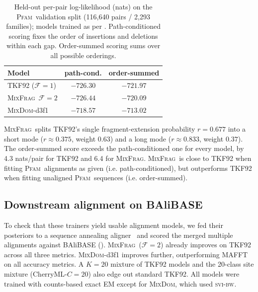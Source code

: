 \documentclass{article}
\newcommand{\MixFrag}{\textsc{MixFrag}}
\newcommand{\MixDom}{\textsc{MixDom}}
\newcommand{\Pfam}{\textsc{Pfam}}
\newcommand{\svibw}{\textsc{svi-bw}}
\begin{document}
\begin{table}[t]
\caption{Held-out per-pair log-likelihood
(nats) on the \Pfam\ validation split (116{,}640 pairs / 2{,}293
families); models trained as per . 
 Path-conditioned scoring fixes the order of insertions and deletions within each gap. Order-summed scoring sums over all possible orderings. }
\label{tab:pfam}
\centering
\setlength{\tabcolsep}{5pt}
\begin{tabular}{@{}lcc@{}}
\toprule
Model & path-cond. & \textbf{order-summed} \\
\midrule
TKF92 ($\mathcal F{=}1$) & $-726.30$ & $-721.97$ \\
\MixFrag\ $\mathcal F{=}2$ & $-726.44$ & $-720.09$ \\
\MixDom-d3f1 & $\mathbf{-718.57}$ & $\mathbf{-713.02}$ \\
\bottomrule
\end{tabular}
\end{table}

\MixFrag\ splits
TKF92's single fragment-extension probability $r{=}0.677$ into a short mode ($r{\approx}0.375$,
weight $0.63$) and a long mode ($r{\approx}0.833$, weight $0.37$). 
The order-summed score exceeds the path-conditioned one for every model, by 4.3 nats/pair for TKF92 and 6.4 for \MixFrag.
\MixFrag\ is close to TKF92 when fitting \Pfam\ alignments as given (i.e. path-conditioned), but outperforms TKF92 when fitting unaligned \Pfam\ sequences (i.e. order-summed).

\subsection{Downstream alignment on BAliBASE}

To check that these trainers yield usable alignment models, we fed their
posteriors to a sequence annealing aligner~\cite{BradleyEtAl2009} and scored the merged
multiple alignments against BAliBASE (). \MixFrag\ ($\mathcal F{=}2$)
already improves on TKF92 across all three metrics. \MixDom-d3f1 improves further,
outperforming MAFFT on
all accuracy metrics.
A $K{=}20$ mixture of TKF92 models and the
20-class site mixture (CherryML-$C{=}20$) also edge out standard TKF92. 
All models were trained with counts-based exact EM except for \MixDom, which used \svibw.
\end{document}
